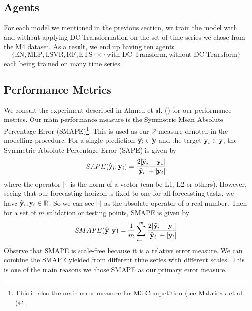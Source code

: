 \subsection{Agents}
For each model we mentioned in the previous section, we train the model with and without applying DC Transformation on the set of time series we chose from the M4 dataset. As a result, we end up having ten agents
\begin{equation*}
    \{\text{EN}, \text{MLP}, \text{LSVR}, \text{RF}, \text{ETS} \} \times \{ \text{with DC Transform}, \text{without DC Transform} \}
\end{equation*}
each being trained on many time series.

\subsection{Performance Metrics}\label{subsec: performance metrics}
We consult the experiment described in Ahmed et al. (\citeyear{2010EmpiricalMLComparison}) for our performance metrics. Our main performance measure is the Symmetric Mean Absolute Percentage Error (SMAPE)\footnote{This is also the main error measure for M3 Competition (see Makridak et al. \citeyear{makridakis2000m3})}. This is used as our $\mathcal{V}$ measure denoted in the modelling procedure. For a single prediction $\widehat{\mathbf{y}}_i \in \widehat{\mathbf{y}}$ and the target $\mathbf{y}_i \in \mathbf{y}$, the Symmetric Absolute Percentage Error (SAPE) is given by
\begin{equation*}
    SAPE(\widehat{\mathbf{y}}_i, \mathbf{y}_i) = \frac{2| \widehat{\mathbf{y}}_i - \mathbf{y}_i|}{|\widehat{\mathbf{y}}_i| + |\mathbf{y}_i| }
\end{equation*}
where the operator $| \cdot |$ is the norm of a vector (can be L1, L2 or others). However, seeing that our forecasting horizon is fixed to one for all forecasting tasks, we have $\widehat{\mathbf{y}}_i, \mathbf{y}_i \in \mathbb{R}$. So we can see $| \cdot |$ as the absolute operator of a real number. Then for a set of $m$ validation or testing points, SMAPE is given by
\begin{equation*}\label{eq: smape}
    SMAPE(\widehat{\mathbf{y}}, \mathbf{y}) = \frac{1}{m} \sum_{i=1}^{m} \frac{2| \widehat{\mathbf{y}}_i - \mathbf{y}_i|}{|\widehat{\mathbf{y}}_i| + |\mathbf{y}_i| }
\end{equation*}
Observe that SMAPE is scale-free because it is a relative error measure. We can combine the SMAPE yielded from different time series with different scales. This is one of the main reasons we chose SMAPE as our primary error measure.

